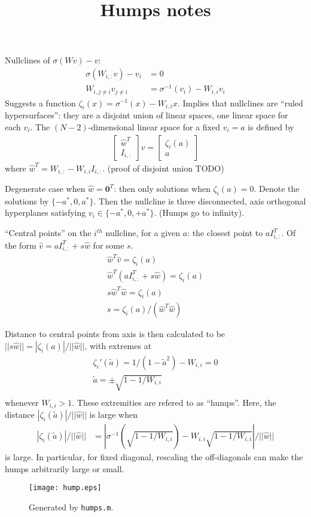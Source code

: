 \documentclass[pdftex,12pt,letterpaper]{article}
\begin{document}
\title{Humps notes}
\date{}
\maketitle

Nullclines of $\sigma(Wv)-v$:
\begin{align}
\sigma(W_{i,:}v) - v_i &= 0 \\
W_{i,j\ne i}v_{j\ne i} &= \sigma^{-1}(v_i) - W_{i,i}v_i
\end{align}
Suggests a function $\zeta_i(x) = \sigma^{-1}(x) - W_{i,i}x$.  Implies that nullclines are ``ruled hypersurfaces'': they are a disjoint union of linear spaces, one linear space for each $v_i$.  The $(N-2)$-dimensional linear space for a fixed $v_i = a$ is defined by
\begin{align}
\left[\begin{array}{c} \hat{w}^T \\ I_{i,:}\end{array}\right]v = \left[\begin{array}{c} \zeta_i(a) \\ a\end{array}\right]
\end{align}
where $\hat{w}^T = W_{i,:} - W_{i,i}I_{i,:}$. (proof of disjoint union TODO)

Degenerate case when $\hat{w} = \mathbf{0}^T$:  then only solutions when $\zeta_i(a) = 0$.  Denote the solutions by $\{-a^*, 0, a^*\}$.  Then the nullcline is three disconnected, axis orthogonal hyperplanes satisfying $v_i \in \{-a^*, 0, +a^*\}$. (Humps go to infinity).

``Central points'' on the $i^{th}$ nullcline, for a given $a$: the closest point to $aI_{i,:}^T$.  Of the form $\hat{v} = aI_{i,:}^T + s\hat{w}$ for some $s$.
\begin{align}
\hat{w}^T\hat{v} = \zeta_i(a) \\
\hat{w}^T(aI_{i,:}^T + s\hat{w}) = \zeta_i(a) \\
s\hat{w}^T\hat{w} = \zeta_i(a) \\
s = \zeta_i(a) / (\hat{w}^T\hat{w})
\end{align}

Distance to central points from axis is then calculated to be $|| s\hat{w} || = |\zeta_i(a)| / ||\hat{w}||$, with extremes at
\begin{align}
\zeta_i'(\tilde{a}) = 1 / (1 - \tilde{a}^2) - W_{i,i} = 0 \\
\tilde{a} = \pm \sqrt{1 - 1/W_{i,i}} \\
\end{align}
whenever $W_{i,i} > 1$.  These extremities are refered to as ``humps''.  Here, the distance $|\zeta_i(\tilde{a})| / ||\hat{w}||$ is large when
\begin{align}
|\zeta_i(\tilde{a})|/||\hat{w}||
&= |\sigma^{-1}(\sqrt{1 - 1/W_{i,i}}) - W_{i,i}\sqrt{1 - 1/W_{i,i}}|/||\hat{w}||
\end{align}
is large.  In particular, for fixed diagonal, rescaling the off-diagonals can make the humps arbitrarily large or small.

\begin{figure}
\centering
\texttt{[image: hump.eps]}
\caption{Generated by \texttt{humps.m}.}
\end{figure}
\end{document}
